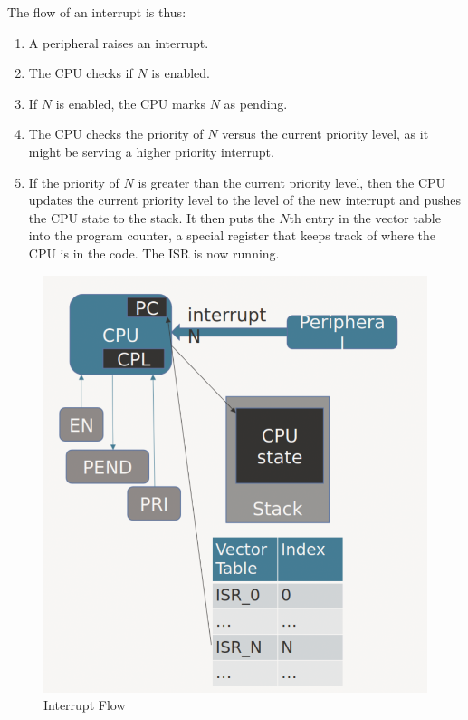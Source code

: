 The flow of an interrupt is thus:
\begin{enumerate}
    \item A peripheral raises an interrupt.
    \item The CPU checks if $N$ is enabled.
    \item If $N$ is enabled, the CPU marks $N$ as pending.
    \item The CPU checks the priority of $N$ versus the current
          priority level, as it might be serving a higher priority interrupt.
    \item If the priority of $N$ is greater than the current priority
          level, then the CPU updates the current priority level to the level of
          the new interrupt and pushes the CPU state to the stack.
          It then puts the $N$th entry in the vector table into the program
          counter, a special register that keeps track of where the CPU
          is in the code. The ISR is now running.
\end{enumerate}
\begin{figure}
    \includegraphics{images/interrupt_flow.png}
    \caption{Interrupt Flow}
    \label{fig:interrupt}
\end{figure}

